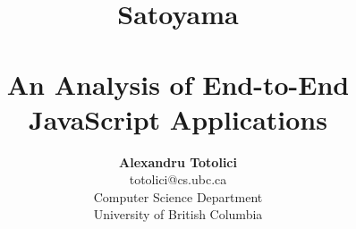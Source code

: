 \documentclass[letterpaper,twocolumn,10pt,draft]{article}
\begin{document}
\date{}

\title{\selectfont
    {\huge{\textbf{Satoyama}}}\\
    {\large{\textbf{\\An Analysis of End-to-End JavaScript Applications}}}}


\author{
{\rm \textbf{Alexandru Totolici}}\\
{\rm totolici@cs.ubc.ca}\\
Computer Science Department\\
University of British Columbia\\
} %

\maketitle

\thispagestyle{empty}

\begin{abstract}
\end{abstract}









%
%
%
%
%

{\footnotesize
    
    }
\end{document}
